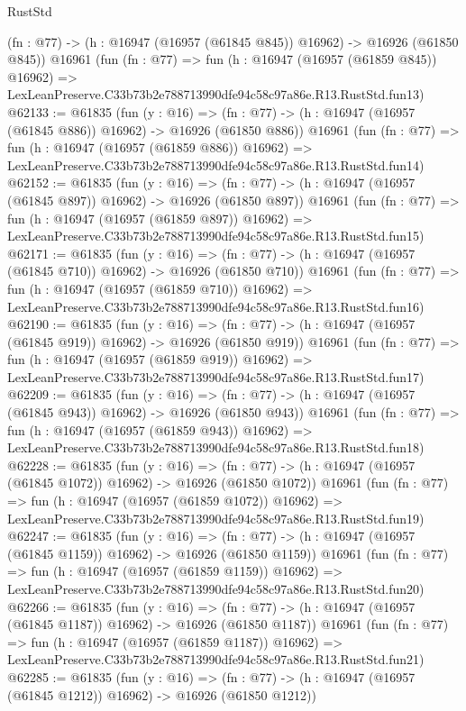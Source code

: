 \begin{lexlean}{RustStd}
\begin{coremodule}
    (fn : @77) -> (h : @16947 (@16957 (@61845 @845)) @16962) -> @16926 (@61850 @845))
    @16961
    (fun (fn : @77) =>
    fun (h : @16947 (@16957 (@61859 @845)) @16962) =>
    LexLeanPreserve.C33b73b2e788713990dfe94c58c97a86e.R13.RustStd.fun13)
@62133 := @61835
    (fun (y : @16) =>
    (fn : @77) -> (h : @16947 (@16957 (@61845 @886)) @16962) -> @16926 (@61850 @886))
    @16961
    (fun (fn : @77) =>
    fun (h : @16947 (@16957 (@61859 @886)) @16962) =>
    LexLeanPreserve.C33b73b2e788713990dfe94c58c97a86e.R13.RustStd.fun14)
@62152 := @61835
    (fun (y : @16) =>
    (fn : @77) -> (h : @16947 (@16957 (@61845 @897)) @16962) -> @16926 (@61850 @897))
    @16961
    (fun (fn : @77) =>
    fun (h : @16947 (@16957 (@61859 @897)) @16962) =>
    LexLeanPreserve.C33b73b2e788713990dfe94c58c97a86e.R13.RustStd.fun15)
@62171 := @61835
    (fun (y : @16) =>
    (fn : @77) -> (h : @16947 (@16957 (@61845 @710)) @16962) -> @16926 (@61850 @710))
    @16961
    (fun (fn : @77) =>
    fun (h : @16947 (@16957 (@61859 @710)) @16962) =>
    LexLeanPreserve.C33b73b2e788713990dfe94c58c97a86e.R13.RustStd.fun16)
@62190 := @61835
    (fun (y : @16) =>
    (fn : @77) -> (h : @16947 (@16957 (@61845 @919)) @16962) -> @16926 (@61850 @919))
    @16961
    (fun (fn : @77) =>
    fun (h : @16947 (@16957 (@61859 @919)) @16962) =>
    LexLeanPreserve.C33b73b2e788713990dfe94c58c97a86e.R13.RustStd.fun17)
@62209 := @61835
    (fun (y : @16) =>
    (fn : @77) -> (h : @16947 (@16957 (@61845 @943)) @16962) -> @16926 (@61850 @943))
    @16961
    (fun (fn : @77) =>
    fun (h : @16947 (@16957 (@61859 @943)) @16962) =>
    LexLeanPreserve.C33b73b2e788713990dfe94c58c97a86e.R13.RustStd.fun18)
@62228 := @61835
    (fun (y : @16) =>
    (fn : @77) -> (h : @16947 (@16957 (@61845 @1072)) @16962) -> @16926 (@61850 @1072))
    @16961
    (fun (fn : @77) =>
    fun (h : @16947 (@16957 (@61859 @1072)) @16962) =>
    LexLeanPreserve.C33b73b2e788713990dfe94c58c97a86e.R13.RustStd.fun19)
@62247 := @61835
    (fun (y : @16) =>
    (fn : @77) -> (h : @16947 (@16957 (@61845 @1159)) @16962) -> @16926 (@61850 @1159))
    @16961
    (fun (fn : @77) =>
    fun (h : @16947 (@16957 (@61859 @1159)) @16962) =>
    LexLeanPreserve.C33b73b2e788713990dfe94c58c97a86e.R13.RustStd.fun20)
@62266 := @61835
    (fun (y : @16) =>
    (fn : @77) -> (h : @16947 (@16957 (@61845 @1187)) @16962) -> @16926 (@61850 @1187))
    @16961
    (fun (fn : @77) =>
    fun (h : @16947 (@16957 (@61859 @1187)) @16962) =>
    LexLeanPreserve.C33b73b2e788713990dfe94c58c97a86e.R13.RustStd.fun21)
@62285 := @61835
    (fun (y : @16) =>
    (fn : @77) -> (h : @16947 (@16957 (@61845 @1212)) @16962) -> @16926 (@61850 @1212))

\end{coremodule}
\end{lexlean}
